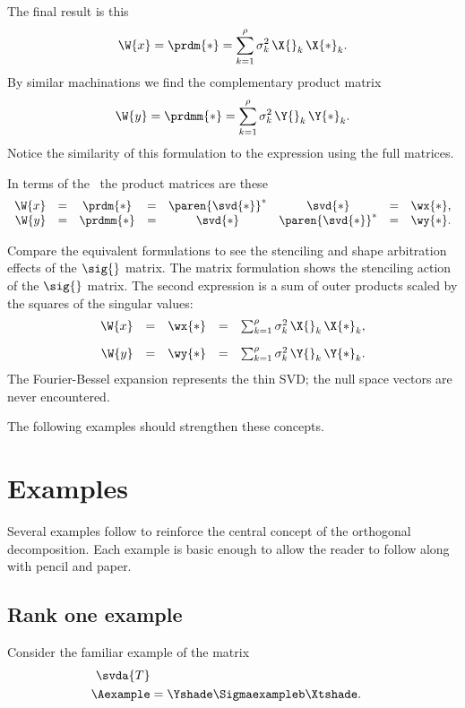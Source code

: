 The final result is this
\begin{equation}
  \W{x} = \prdm{*} = \sum_{k=1}^{\rho}{\sigma_{k}^{2}\,\X{}_{k}\,\X{*}_{k}}.
\end{equation}
By similar machinations we find the complementary product matrix
\begin{equation}
  \W{y} = \prdmm{*} = \sum_{k=1}^{\rho}{\sigma_{k}^{2}\,\Y{}_{k}\,\Y{*}_{k}}.
\end{equation}
Notice the similarity of this formulation to the expression using the full matrices.

In terms of the \svdl \ the product matrices are these
\begin{equation}
  \begin{array}{rccccccl}
    \W{x} &=& \prdm{*}  &=& \paren{\svd{*}}^{*}&\svd{*} &=& \wx{*},\\
    \W{y} &=& \prdmm{*} &=& \svd{*}&\paren{\svd{*}}^{*} &=& \wy{*}.
  \end{array}
\end{equation}

Compare the equivalent formulations to see the stenciling and shape arbitration effects of the $\sig{}$ matrix. The matrix formulation shows the stenciling action of the $\sig{}$ matrix. The second expression is a sum of outer products scaled by the squares of the singular values:
\begin{equation}
  \begin{array}{rcccc}
    \W{x} &=& \wx{*} &=& \sum_{k=1}^{\rho}{\sigma_{k}^{2}\,\X{}_{k}\,\X{*}_{k}},\\[10pt]
    \W{y} &=& \wy{*} &=& \sum_{k=1}^{\rho}{\sigma_{k}^{2}\,\Y{}_{k}\,\Y{*}_{k}}.
  \end{array}
\end{equation}
The Fourier-Bessel expansion represents the thin SVD; the null space vectors are never encountered.

The following examples should strengthen these concepts.

\section{Examples}
Several examples follow to reinforce the central concept of the orthogonal decomposition. Each example is basic enough to allow the reader to follow along with pencil and paper.

\subsection{Rank one example}
Consider the familiar example of the matrix
\begin{equation}
  \begin{split}
    \svda{T}\\
    \Aexample &=\Yshade \Sigmaexampleb \Xtshade.
  \end{split}
\end{equation}

